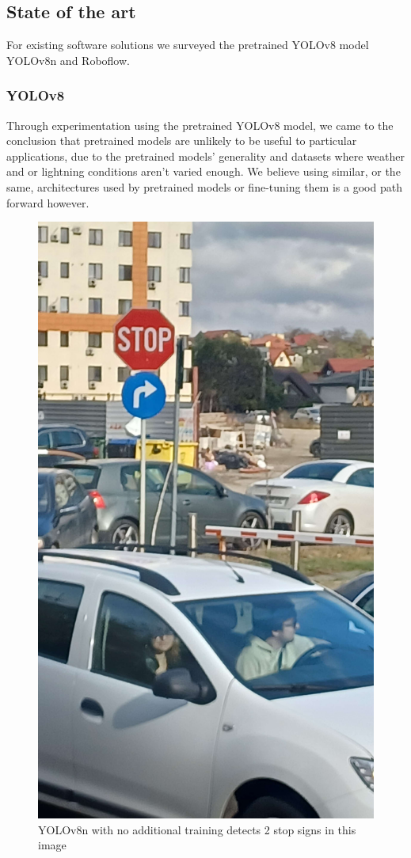 \documentclass[conference]{IEEEtran}
\begin{document}
\subsection{State of the art}

For existing software solutions we surveyed the pretrained YOLOv8\cite{Jocher_YOLO_by_Ultralytics_2023} model YOLOv8n and Roboflow.

\subsubsection{YOLOv8}
Through experimentation using the pretrained YOLOv8 model, we came to the conclusion that pretrained
models are unlikely to be useful to particular applications, due to the pretrained models' generality
and datasets where weather and or lightning conditions aren't varied enough. We believe using similar,
or the same, architectures used by pretrained models or fine-tuning them is a good path forward however.

\begin{figure}[h!]
    \centerline{\includegraphics[width=0.5\linewidth,]{poza-fata-ac}}
    \caption{YOLOv8n with no additional training detects 2 stop signs in this image}
    \label{poza-fata-ac}
\end{figure}
\end{document}
